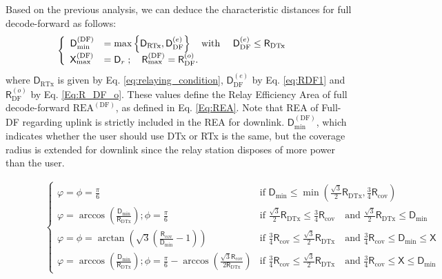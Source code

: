 \documentclass[journal]{IEEEtran}
\theoremstyle{definition}
\begin{document}
Based on the previous analysis, we can deduce the characteristic distances for full decode-forward as follows:
\begin{align}
\hspace*{-10pt}\left\lbrace \begin{array}{l l}
\mathsf{D}_{\min}^{(\text{DF})} & =\max \left\{ \mathsf{D}_{\text{RTx}}, \mathsf{D}_{\text{DF}}^{(e)} \right \} \quad \text{with } \quad \mathsf{D}_{\text{DF}}^{(e)} \leq \mathsf{R}_{\text{DTx}}\\
\mathsf{X}_{\max}^{(\text{DF})} & = \mathsf{D}_{r} \; ; \quad
\mathsf{R}_{\max}^{(\text{DF})} = \mathsf{R}_{\text{DF}}^{(o)} .
\end{array}
\right. 
\end{align}
where $\mathsf{D}_{\text{RTx}}$ is given by Eq. \eqref{eq:relaying_condition}, $\mathsf{D}_{\text{DF}}^{(e)}$ by Eq. \eqref{eq:RDF1} and $\mathsf{R}_{\text{DF}}^{(o)}$ by Eq. \eqref{Eq:R_DF_o}.
These values define the Relay Efficiency Area of full decode-forward $\text{REA}^{(\text{DF})}$, as defined in Eq. \eqref{Eq:REA}.
Note that REA of Full-DF regarding uplink is strictly included in the REA for downlink. $\mathsf{D}_{\min}^{(\text{DF})}$, which indicates whether the user should use DTx or RTx is the same, but the coverage radius is extended for downlink since the relay station disposes of more power than the user.



\begin{figure*}[!t]
\setcounter{MYtempeqncnt}{\value{equation}}
\setcounter{equation}{18}
\small{
\begin{align}
&\left \lbrace
\begin{array}{ll}
\varphi = \phi = \frac{\pi}{6}
&
\text{if } \mathsf{D}_{\min} \leq \min \left(\frac{\sqrt{3}}{2}\mathsf{R}_{\text{DTx}}, \frac{3}{4}\mathsf{R}_{\text{cov}}\right)
\\
\varphi = \arccos \left(\frac{\mathsf{D}_{\min}}{\mathsf{R}_{\text{DTx}}}\right); \phi = \frac{\pi}{6}
&
\text{if } \frac{\sqrt{3}}{2}\mathsf{R}_{\text{DTx}} \leq  \frac{3}{4}\mathsf{R}_{\text{cov}}
 \quad \text{and } \frac{\sqrt{3}}{2}\mathsf{R}_{\text{DTx}} \leq \mathsf{D}_{\min} \\
\varphi = \phi = \arctan \left(\sqrt{3} \left( \frac{\mathsf{R}_{\text{cov}} }{\mathsf{D}_{\min}} -1\right)\right)
&
\text{if } \frac{3}{4}\mathsf{R}_{\text{cov}} \leq  \frac{\sqrt{3}}{2}\mathsf{R}_{\text{DTx}} 
 \quad \text{and } \frac{3}{4}\mathsf{R}_{\text{cov}} \leq \mathsf{D}_{\min} \leq \mathsf{X}
\\
\varphi = \arccos \left(\frac{\mathsf{D}_{\min}}{\mathsf{R}_{\text{DTx}}}\right); \phi = \frac{\pi}{6} - \arccos \left(\frac{\sqrt{3}\mathsf{R}_{\text{cov}}}{2\mathsf{R}_{\text{DTx}}}\right)
&
\text{if } \frac{3}{4}\mathsf{R}_{\text{cov}} \leq  \frac{\sqrt{3}}{2}\mathsf{R}_{\text{DTx}} 
 \quad \text{and } \frac{3}{4}\mathsf{R}_{\text{cov}} \leq  \mathsf{X} \leq \mathsf{D}_{\min}
\end{array}
\right.
\label{eq:angles}
\end{align}
}
\hrulefill
\setcounter{equation}{\value{MYtempeqncnt}}
\end{figure*}
\end{document}
